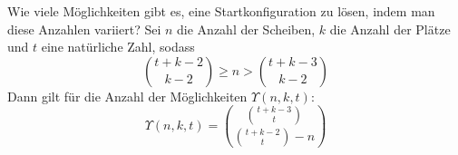 \begin{frame}{Wie viele Möglichkeiten gibt es, eine Startkonfiguration zu lösen, indem man diese Anzahlen variiert?}
    Sei $n$ die Anzahl der Scheiben, $k$ die Anzahl der Plätze und $t$ eine natürliche Zahl, sodass
    \[\binom{t+k-2}{k-2}\geq n>\binom{t+k-3}{k-2}\]
    Dann gilt für die Anzahl der Möglichkeiten $\Upsilon(n,k,t)$:
    \[\Upsilon(n,k,t)=\binom{\binom{t+k-3}{t}}{\binom{t+k-2}{t}-n}\]
\end{frame}